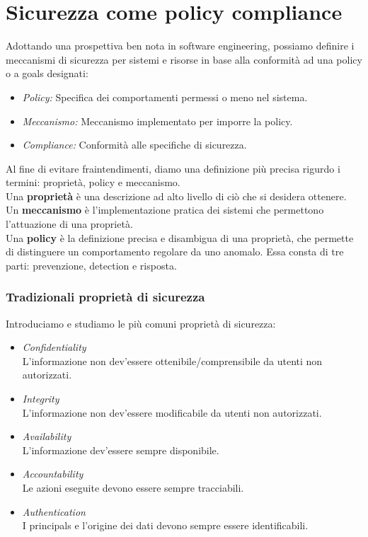 \documentclass[a4paper, 11pt, twoside, openright, fleqn]{report}
\begin{document}
\section{Sicurezza come policy compliance}
Adottando una prospettiva ben nota in software engineering, possiamo definire i meccanismi di sicurezza per sistemi e risorse in base alla conformità ad una policy o a goals designati:
\begin{itemize}[itemsep=0pt, topsep=6pt]
	\item \emph{Policy:} Specifica dei comportamenti permessi o meno nel sistema.
	\item \emph{Meccanismo:} Meccanismo implementato per imporre la policy.
	\item \emph{Compliance:} Conformità alle specifiche di sicurezza.
\end{itemize}
Al fine di evitare fraintendimenti, diamo una definizione più precisa rigurdo i termini: proprietà, policy e meccanismo.\\
Una \textbf{proprietà} è una descrizione ad alto livello di ciò che si desidera ottenere.\\
Un \textbf{meccanismo} è l'implementazione pratica dei sistemi che permettono l'attuazione di una proprietà.\\
Una \textbf{policy} è la definizione precisa e disambigua di una proprietà, che permette di distinguere un comportamento regolare da uno anomalo. Essa consta di tre parti: prevenzione, detection e risposta.

\subsubsection{Tradizionali proprietà di sicurezza}
Introduciamo e studiamo le più comuni proprietà di sicurezza:
\begin{itemize}[itemsep=0pt]
	\item \emph{Confidentiality}\\
	L'informazione non dev'essere ottenibile/comprensibile da utenti non autorizzati.
	\item \emph{Integrity}\\
	L'informazione non dev'essere modificabile da utenti non autorizzati.
	\item \emph{Availability}\\
	L'informazione dev'essere sempre disponibile.
	\item \emph{Accountability}\\
	Le azioni eseguite devono essere sempre tracciabili.
	\item \emph{Authentication}\\
	I principals e l'origine dei dati devono sempre essere identificabili.
\end{itemize}
\end{document}
